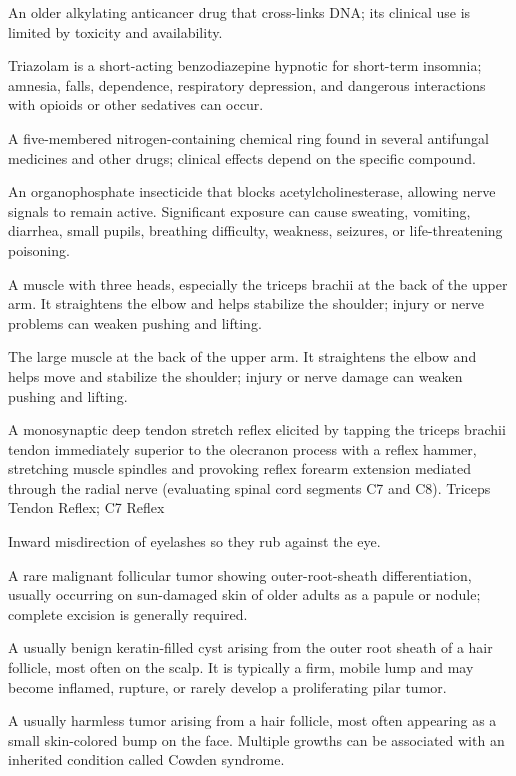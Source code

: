 An older alkylating anticancer drug that cross-links DNA; its clinical use is limited by toxicity and availability.

 Triazolam is a short-acting benzodiazepine hypnotic for short-term insomnia; amnesia, falls, dependence, respiratory depression, and dangerous interactions with opioids or other sedatives can occur.

 A five-membered nitrogen-containing chemical ring found in several antifungal medicines and other drugs; clinical effects depend on the specific compound.

 An organophosphate insecticide that blocks acetylcholinesterase, allowing nerve signals to remain active. Significant exposure can cause sweating, vomiting, diarrhea, small pupils, breathing difficulty, weakness, seizures, or life-threatening poisoning.

 A muscle with three heads, especially the triceps brachii at the back of the upper arm. It straightens the elbow and helps stabilize the shoulder; injury or nerve problems can weaken pushing and lifting.

 The large muscle at the back of the upper arm. It straightens the elbow and helps move and stabilize the shoulder; injury or nerve damage can weaken pushing and lifting.

 A monosynaptic deep tendon stretch reflex elicited by tapping the triceps brachii tendon immediately superior to the olecranon process with a reflex hammer, stretching muscle spindles and provoking reflex forearm extension mediated through the radial nerve (evaluating spinal cord segments C7 and C8).
\synonyms
Triceps Tendon Reflex; C7 Reflex

 Inward misdirection of eyelashes so they rub against the eye.

 A rare malignant follicular tumor showing outer-root-sheath differentiation, usually occurring on sun-damaged skin of older adults as a papule or nodule; complete excision is generally required.

 A usually benign keratin-filled cyst arising from the outer root sheath of a hair follicle, most often on the scalp. It is typically a firm, mobile lump and may become inflamed, rupture, or rarely develop a proliferating pilar tumor.

 A usually harmless tumor arising from a hair follicle, most often appearing as a small skin-colored bump on the face. Multiple growths can be associated with an inherited condition called Cowden syndrome.

